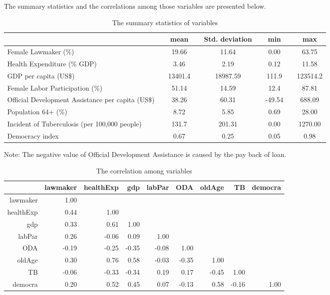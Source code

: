\documentclass[12pt]{article}
\begin{document}
The summary statistics and the correlations among those variables are presented below.
\begin{table}[]
\begin{tabular}{lcccccccc}
\hline
                                                  &  & mean    &  & Std. deviation &  & min    &  & max      \\ \hline
Female Lawmaker (\%)                              &  & 19.66   &  & 11.64          &  & 0.00   &  & 63.75    \\
Health Expenditure (\% GDP)                       &  & 3.46    &  & 2.19           &  & 0.12   &  & 11.58    \\
GDP per capita (US\$)                             &  & 13401.4 &  & 18987.59       &  & 111.9  &  & 123514.2 \\
Female Labor Participation (\%)                   &  & 51.14   &  & 14.59          &  & 12.4   &  & 87.81    \\
Official Development Assistance per capita (US\$) &  & 38.26   &  & 60.31          &  & -49.54 &  & 688.09   \\
Population 64+ (\%)                               &  & 8.72    &  & 5.85           &  & 0.69   &  & 28.00    \\
Incident of Tuberculosis (per 100,000 people)     &  & 131.7   &  & 201.31         &  & 0.00   &  & 1270.00  \\
Democracy index                                   &  & 0.67    &  & 0.25           &  & 0.05   &  & 0.98     \\ \hline
\end{tabular}
\begin{tablenotes}
\small
      \item Note: The negative value of Official Development Assistance is caused by the pay back of loan.
    \end{tablenotes}
    \caption{The summary statistics of variables}
\end{table}

\begin{table}[h]
\centering
\begin{tabular}{rrrrrrrrr}
  \hline
 & lawmaker & healthExp & gdp & labPar & ODA & oldAge & TB & democra \\ 
  \hline
 lawmaker & 1.00 & &  &  &  &  &  & \\ 
  healthExp & 0.44 & 1.00 &  & &  &  & & \\ 
  gdp & 0.33 & 0.61 & 1.00 &  &  &  &  &  \\ 
  labPar & 0.26 & -0.06 & 0.09 & 1.00 &  &  &  &  \\ 
  ODA & -0.19 & -0.25 & -0.35 & -0.08 & 1.00 &  &  &  \\ 
  oldAge & 0.30 & 0.76 & 0.58 & -0.03 & -0.35 & 1.00 &  &  \\ 
  TB & -0.06 & -0.33 & -0.34 & 0.19 & 0.17 & -0.45 & 1.00 &  \\ 
  democra & 0.20 & 0.52 & 0.45 & 0.07 & -0.13 & 0.58 & -0.16 & 1.00 \\ 
   \hline
\end{tabular}
\caption{The correlation among variables}
\label{correlation}
\end{table}
\end{document}

